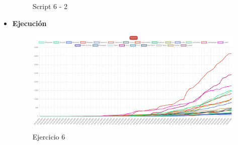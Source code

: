 \documentclass{article}
\begin{document}
\begin{itemize}
\begin{figure}[H]
			\caption{Script 6 - 2}
		\end{figure}
		\item \textbf{Ejecución}
		\begin{figure}[H]
			\centering
			\includegraphics[width=1\textwidth,keepaspectratio]{img/Ejecucion6.png}
			\caption{Ejercicio 6}
		\end{figure}
	\end{itemize}
	\newpage
\end{document}
